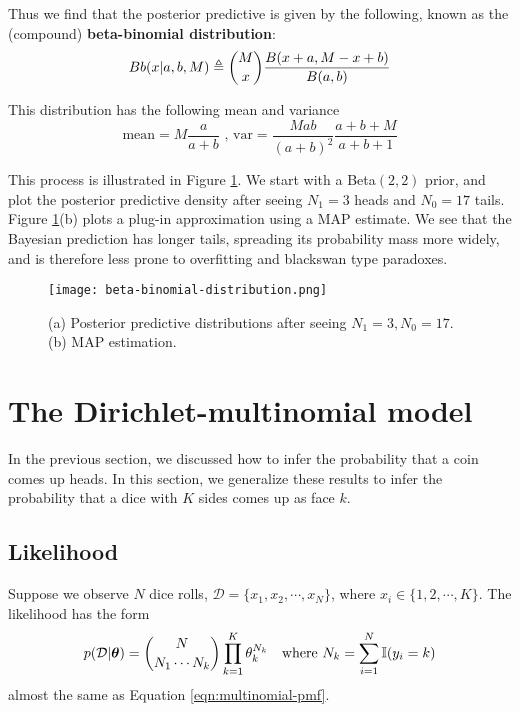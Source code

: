 Thus we find that the posterior predictive is given by the following, known as the (compound) \textbf{beta-binomial distribution}:
\begin{equation}
Bb(x|a,b,M) \triangleq \dbinom{M}{x}\dfrac{B(x+a,M-x+b)}{B(a,b)}
\end{equation}

This distribution has the following mean and variance
\begin{equation}
\text{mean}=M\dfrac{a}{a+b} \text{ , var}=\dfrac{Mab}{(a+b)^2}\dfrac{a+b+M}{a+b+1}
\end{equation}

This process is illustrated in Figure \ref{fig:beta-binomial-distribution}. We start with a Beta$(2,2)$ prior, and plot the posterior predictive density after seeing $N_1 =3$ heads and $N_0 =17$ tails. Figure \ref{fig:beta-binomial-distribution}(b) plots a plug-in approximation using a MAP estimate. We see that the Bayesian prediction has longer tails, spreading its probability mass more widely, and is therefore less prone to overfitting and blackswan type paradoxes.

\begin{figure}[hbtp]
\centering
    \texttt{[image: beta-binomial-distribution.png]}
\caption{(a) Posterior predictive distributions after seeing $N_1=3,N_0=17$. (b) MAP estimation.}
\label{fig:beta-binomial-distribution} 
\end{figure}


\section{The Dirichlet-multinomial model}
In the previous section, we discussed how to infer the probability that a coin comes up heads. In this section, we generalize these results to infer the probability that a dice with $K$ sides comes up as face $k$. 


\subsection{Likelihood}
Suppose we observe $N$ dice rolls, $\mathcal{D}=\{x_1,x_2,\cdots,x_N\}$, where $x_i \in \{1,2,\cdots,K\}$. The likelihood has the form
\begin{equation}
p(\mathcal{D}|\vec{\theta}) = \dbinom{N}{N_1 \cdots N_k} \prod\limits_{k=1}^K\theta_k^{N_k} \quad \text{where } N_k=\sum\limits_{i=1}^N \mathbb{I}(y_i=k)
\end{equation}
almost the same as Equation \eqref{eqn:multinomial-pmf}.


